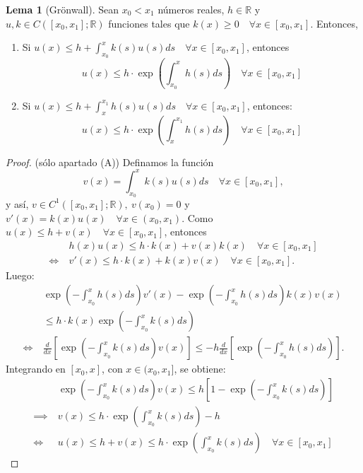 \documentclass[11pt]{article}
\theoremstyle{definition} %
\newtheorem{lemma}[theorem]{Lema}
\newcommand{\R}{\mathbb{R}}
\begin{document}
\begin{lemma}[Grönwall]
	Sean $x_0 < x_1$ números reales, $h \in \R$ y $u,k \in C([x_0,x_1];\R)$ funciones tales que $k(x) \geq 0 \quad \forall x \in [x_0,x_1]$. Entonces,
	\begin{enumerate}
		\item[(A)] Si $u(x) \leq h + \int_{x_{0}}^{x} k(s)u(s) ds \quad \forall x \in [x_0,x_1]$, entonces
		\[ u(x) \leq h\cdot \exp\left( \int_{x_{0}}^{x} h(s)ds \right) \quad \forall x \in [x_{0},x_{1}] \]

		\item [(B)] Si $u(x) \leq h + \int_{x}^{x_{1}}h(s)u(s)ds \quad \forall x \in [x_{0},x_{1}]$, entonces:
		\[ u(x) \leq h \cdot \exp \left( \int_{x}^{x_{1}}h(s)ds \right) \quad \forall x \in [x_{0},x_{1}] \]
	\end{enumerate}
\end{lemma}
\begin{proof}(sólo apartado (A))
	Definamos la función 
	\[ v(x) = \int_{x_{0}}^{x} k(s)u(s)ds \quad \forall x \in [x_{0},x_{1}], \]
	y así, $v \in C^1([x_{0},x_{1}];\R),\ v(x_{0}) = 0$ y $v'(x) = k(x)u(x) \quad \forall x \in (x_{0},x_{1})$. Como $u(x) \leq h + v(x) \quad \forall x \in [x_{0},x_{1}]$, entonces
	\begin{align*}
		& h(x)u(x) \leq h\cdot k(x) + v(x)k(x) \quad \forall x \in [x_{0},x_{1}] \\
		\iff \ & v'(x) \leq h\cdot k(x) + k(x)v(x) \quad \forall x \in [x_{0},x_{1}]
	.\end{align*}
	Luego:
	\begin{align*}
		& \exp \left( - \int_{x_{0}}^{x} h(s)ds \right) v'(x) - \exp \left(- \int_{x_{0}}^{x}h(s)ds \right)k(x)v(x) \\
		& \leq h\cdot k(x) \exp \left( - \int_{x_{0}}^{x} k(s)ds \right) \\
		\iff \ & \frac{d}{dx} \left[ \exp \left(-\int_{x_{0}}^{x}k(s)ds\right)v(x) \right] \leq -h \frac{d}{dx} \left[ \exp \left( - \int_{x_{0}}^{x} h(s)ds \right) \right]
	.\end{align*}
	Integrando en $[x_{0},x]$, con $x \in (x_{0},x_{1}]$, se obtiene:
	\begin{align*}
		& \exp \left( -\int_{x_{0}}^{x}k(s)ds \right) v(x) \leq h \left[ 1 - \exp \left( -\int_{x_{0}}^{x} k(s)ds \right) \right] \\
		\implies \ & v(x) \leq h \cdot \exp \left( \int_{x_{0}}^{x} k(s)ds \right) -h \\
		\iff \ & u(x) \leq h + v(x) \leq h \cdot \exp \left( \int_{x_{0}}^{x}k(s)ds \right) \quad \forall x \in [x_{0},x_{1}]
	\end{align*}
\end{proof}
\end{document}
